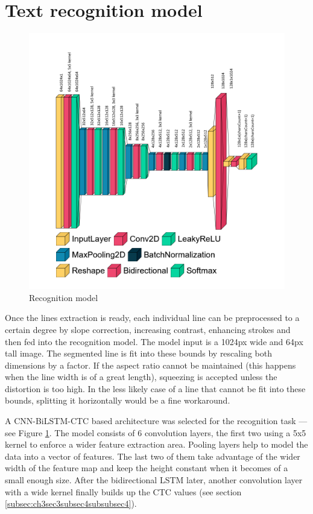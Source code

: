 \section{Text recognition model}
\label{subsec:ch5sec4}

\begin{figure}[htbp]
    \centering
        \includegraphics[scale=0.4]{figures/recog_model}
    \caption{Recognition model \cite{visualKeras}}
    \label{FigRecogModel}        
\end{figure}

Once the lines extraction is ready, each individual line can be preprocessed to a certain degree by slope correction, increasing contrast, enhancing strokes \cite{Juan} and then fed into the recognition model. The model input is a 1024px wide and 64px tall image. The segmented line is fit into these bounds by rescaling both dimensions by a factor. If the aspect ratio cannot be maintained (this happens when the line width is of a great length), squeezing is accepted unless the distortion is too high. In the less likely case of a line that cannot be fit into these bounds, splitting it horizontally would be a fine workaround.

A CNN-BiLSTM-CTC based architecture \cite{cnnbilstm} was selected for the recognition task --- see Figure \ref{FigRecogModel}.  The model consists of 6 convolution layers, the first two using a 5x5 kernel to enforce a wider feature extraction area. Pooling layers help to model the data into a vector of features. The last two of them take advantage of the wider width of the feature map \cite{cnnbilstm} and keep the height constant when it becomes of a small enough size. After the bidirectional LSTM later, another convolution layer with a wide kernel finally builds up the CTC values (see section \ref{subsec:ch3sec3subsec4subsubsec4}).

